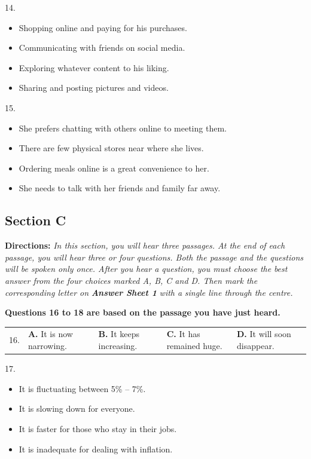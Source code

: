 \documentclass[UTF8,11pt]{ctexart}
\begin{document}
14.


\begin{itemize}[leftmargin=2em,itemsep=.2em,topsep=.4em]\item[A.] Shopping online and paying for his purchases.
\item[B.] Communicating with friends on social media.
\item[C.] Exploring whatever content to his liking.
\item[D.] Sharing and posting pictures and videos.
\end{itemize}

15.


\begin{itemize}[leftmargin=2em,itemsep=.2em,topsep=.4em]\item[A.] She prefers chatting with others online to meeting them.
\item[B.] There are few physical stores near where she lives.
\item[C.] Ordering meals online is a great convenience to her.
\item[D.] She needs to talk with her friends and family far away.
\end{itemize}

\subsection*{\textbf{Section C}}


\textbf{Directions:}\textit{ In this section, you will hear three passages. At the end of each passage, you will hear three or four} \textit{questions. Both the passage and the questions will be spoken only once. After you hear a question, you must choose the} \textit{best answer from the four choices marked A, B, C and D. Then mark the corresponding letter on }\textbf{\textit{Answer Sheet 1}}\textit{ with a} \textit{single line through the centre.}


\textbf{Questions 16 to 18 are based on the passage you have just heard.}


\noindent\begin{tabularx}{\linewidth}{@{}lXXXX@{}}16. & \textbf{A.} It is now narrowing. & \textbf{B.} It keeps increasing. & \textbf{C.} It has remained huge. & \textbf{D.} It will soon disappear.\\\end{tabularx}\par

17.


\begin{itemize}[leftmargin=2em,itemsep=.2em,topsep=.4em]\item[A.] It is fluctuating between 5\% – 7\%.
\item[B.] It is slowing down for everyone.
\item[C.] It is faster for those who stay in their jobs.
\item[D.] It is inadequate for dealing with inflation.
\end{itemize}
\end{document}
